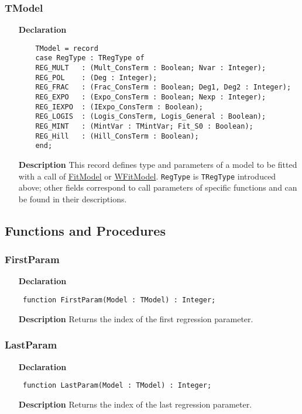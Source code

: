 \documentclass[12pt,a4paper,oneside]{report}
\newcommand{\declarationitem}[1]{\textbf{#1}}
\newcommand{\descriptiontitle}[1]{\textbf{#1}}
\newcommand{\code}[1]{\texttt{#1}}
\begin{document}
\subsubsection{TModel}
\label{umodels-TModel}
\begin{itemize}
	\item[\declarationitem{Declaration}\hfill]
	
	\begin{verbatim}
	TModel = record
	case RegType : TRegType of
	REG_MULT   : (Mult_ConsTerm : Boolean; Nvar : Integer);
	REG_POL    : (Deg : Integer);
	REG_FRAC   : (Frac_ConsTerm : Boolean; Deg1, Deg2 : Integer);
	REG_EXPO   : (Expo_ConsTerm : Boolean; Nexp : Integer);
	REG_IEXPO  : (IExpo_ConsTerm : Boolean);
	REG_LOGIS  : (Logis_ConsTerm, Logis_General : Boolean);
	REG_MINT   : (MintVar : TMintVar; Fit_S0 : Boolean);
	REG_Hill   : (Hill_ConsTerm : Boolean);
	end;
	\end{verbatim}			
	\item[\descriptiontitle{Description}]
	This record defines type and parameters of a model to be fitted with a call of \hyperref[umodels-FitModel]{FitModel} or \hyperref[umodels-WFitModel]{WFitModel}. \code{RegType} is \code{TRegType} introduced above; other fields correspond to call parameters of specific functions and can be found in their descriptions. 
\end{itemize}

\subsection{Functions and Procedures}
\subsubsection{FirstParam}
\label{umodels-FirstParam}
\begin{itemize}\item[\declarationitem{Declaration}\hfill]
	\begin{flushleft}
		\code{
			function FirstParam(Model : TModel) : Integer;}
		
	\end{flushleft}
	
	\par
	\item[\descriptiontitle{Description}]
	Returns the index of the first regression parameter. 	
\end{itemize}
\subsubsection{LastParam}
\label{umodels-LastParam}
\begin{itemize}\item[\declarationitem{Declaration}\hfill]
	\begin{flushleft}
		\code{
			function LastParam(Model : TModel) : Integer;}
		
	\end{flushleft}
	
	\par
	\item[\descriptiontitle{Description}]
	Returns the index of the last regression parameter. 	
\end{itemize}
\end{document}
